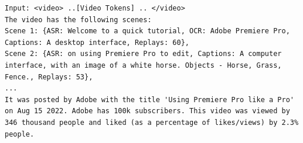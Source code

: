 \begin{lstlisting}[caption={Verbalization pattern for inputting content and behavior in the same space},frame=single,label={lcbm:verbalization},basicstyle=\scriptsize]
Input: <video> ..[Video Tokens] .. </video> 
The video has the following scenes:
Scene 1: {ASR: Welcome to a quick tutorial, OCR: Adobe Premiere Pro, Captions: A desktop interface, Replays: 60}, 
Scene 2: {ASR: on using Premiere Pro to edit, Captions: A computer interface, with an image of a white horse. Objects - Horse, Grass, Fence., Replays: 53}, 
... 
It was posted by Adobe with the title 'Using Premiere Pro like a Pro' on Aug 15 2022. Adobe has 100k subscribers. This video was viewed by 346 thousand people and liked (as a percentage of likes/views) by 2.3% people. 
\end{lstlisting}

